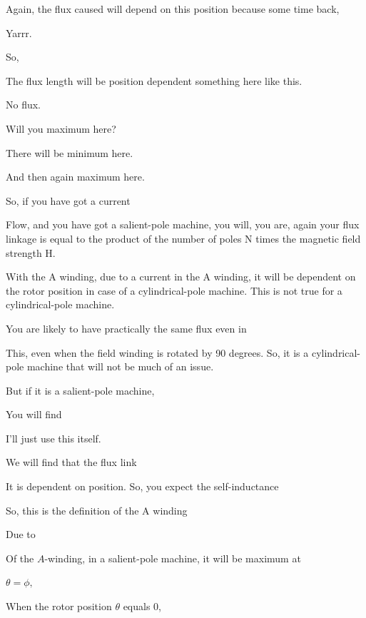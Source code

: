 \documentclass{article}
\begin{document}
Again, the flux caused will depend on this position because some time back,

Yarrr.

So,

The flux length will be position dependent something here like this.

No flux.

Will you maximum here?

There will be minimum here.

And then again maximum here.

So, if you have got a current

Flow, and you have got a salient-pole machine, you will, you are, again your flux linkage is equal to the product of the number of poles N times the magnetic field strength H.

With the A winding, due to a current in the A winding, it will be dependent on the rotor position in case of a cylindrical-pole machine. This is not true for a cylindrical-pole machine.

You are likely to have practically the same flux even in

This, even when the field winding is rotated by 90 degrees. So, it is a cylindrical-pole machine that will not be much of an issue.

But if it is a salient-pole machine,

You will find

I'll just use this itself.

We will find that the flux link

It is dependent on position. So, you expect the self-inductance

So, this is the definition of the A winding

Due to





Of the $A$-winding, in a salient-pole machine, it will be maximum at

$\theta = \phi,$

When the rotor position $\theta$ equals $0$,
\end{document}

